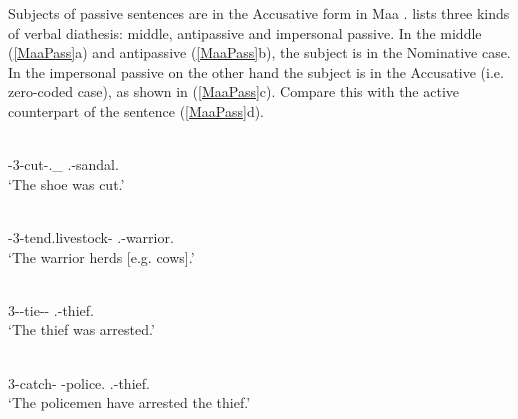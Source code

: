 Subjects of passive sentences are in the Accusative form in Maa .
\citet{Payne:2007} lists three kinds of verbal diathesis: middle, antipassive and impersonal passive.
In the middle (\ref{MaaPass}a) and antipassive (\ref{MaaPass}b), the subject is in the Nominative  case. 
In the impersonal passive on the other hand the subject is in the Accusative (i.e. zero-coded case), as shown in (\ref{MaaPass}c). 
Compare this with the active counterpart of the sentence (\ref{MaaPass}d).

\begin{exe}\ex\label{MaaPass}
\begin{xlist}
\ex\gll{} \\
\con{}-3-cut-\Mid{}.\Non\_\pfv{} \fem{}.\sg{}-sandal.\nom{}\\
\glt `The shoe was cut.'

\ex\gll{} \\
\con{}-3-tend.livestock-\antip{} \mas{}.\sg{}-warrior.\nom{}\\
\glt `The warrior herds [e.g. cows].'

\ex\gll{} \\
3-\pfv{}-tie-\pfv{}-\pass{} \mas{}.\sg{}-thief.\acc{}\\
\glt `The thief was arrested.'

\ex\gll{} 	\\
3-catch-\pfv{} \pl{}-police.\nom{} \mas{}.\sg{}-thief.\acc{}\\
\glt `The policemen have arrested the thief.'
\end{xlist}
\end{exe}




